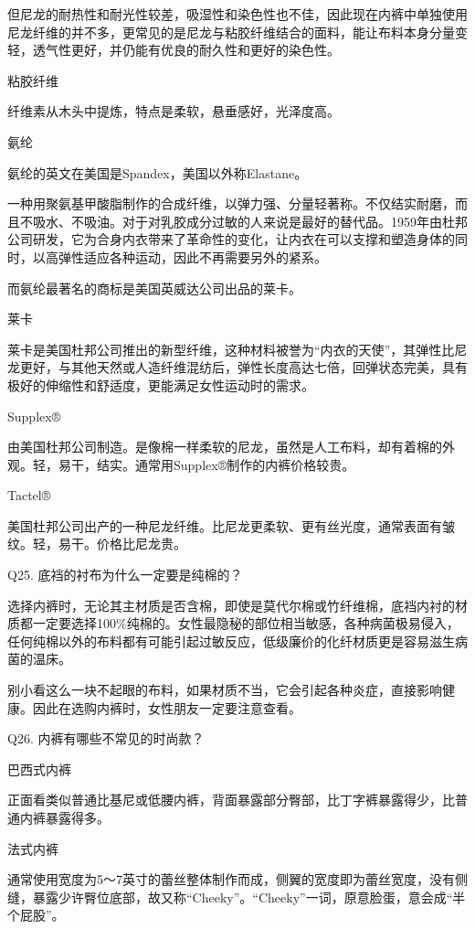 \documentclass[12pt,UTF8]{ctexbook}
\begin{document}
但尼龙的耐热性和耐光性较差，吸湿性和染色性也不佳，因此现在内裤中单独使用尼龙纤维的并不多，更常见的是尼龙与粘胶纤维结合的面料，能让布料本身分量变轻，透气性更好，并仍能有优良的耐久性和更好的染色性。

粘胶纤维

纤维素从木头中提炼，特点是柔软，悬垂感好，光泽度高。

氨纶

氨纶的英文在美国是Spandex，美国以外称Elastane。

一种用聚氨基甲酸脂制作的合成纤维，以弹力强、分量轻著称。不仅结实耐磨，而且不吸水、不吸油。对于对乳胶成分过敏的人来说是最好的替代品。1959年由杜邦公司研发，它为合身内衣带来了革命性的变化，让内衣在可以支撑和塑造身体的同时，以高弹性适应各种运动，因此不再需要另外的紧系。

而氨纶最著名的商标是美国英威达公司出品的莱卡。

莱卡

莱卡是美国杜邦公司推出的新型纤维，这种材料被誉为“内衣的天使”，其弹性比尼龙更好，与其他天然或人造纤维混纺后，弹性长度高达七倍，回弹状态完美，具有极好的伸缩性和舒适度，更能满足女性运动时的需求。

Supplex®

由美国杜邦公司制造。是像棉一样柔软的尼龙，虽然是人工布料，却有着棉的外观。轻，易干，结实。通常用Supplex®制作的内裤价格较贵。

Tactel®

美国杜邦公司出产的一种尼龙纤维。比尼龙更柔软、更有丝光度，通常表面有皱纹。轻，易干。价格比尼龙贵。





Q25. 底裆的衬布为什么一定要是纯棉的？


选择内裤时，无论其主材质是否含棉，即使是莫代尔棉或竹纤维棉，底裆内衬的材质都一定要选择100\%纯棉的。女性最隐秘的部位相当敏感，各种病菌极易侵入，任何纯棉以外的布料都有可能引起过敏反应，低级廉价的化纤材质更是容易滋生病菌的温床。

别小看这么一块不起眼的布料，如果材质不当，它会引起各种炎症，直接影响健康。因此在选购内裤时，女性朋友一定要注意查看。





Q26. 内裤有哪些不常见的时尚款？


巴西式内裤

正面看类似普通比基尼或低腰内裤，背面暴露部分臀部，比丁字裤暴露得少，比普通内裤暴露得多。

法式内裤

通常使用宽度为5～7英寸的蕾丝整体制作而成，侧翼的宽度即为蕾丝宽度，没有侧缝，暴露少许臀位底部，故又称“Cheeky”。“Cheeky”一词，原意脸蛋，意会成“半个屁股”。
\end{document}
